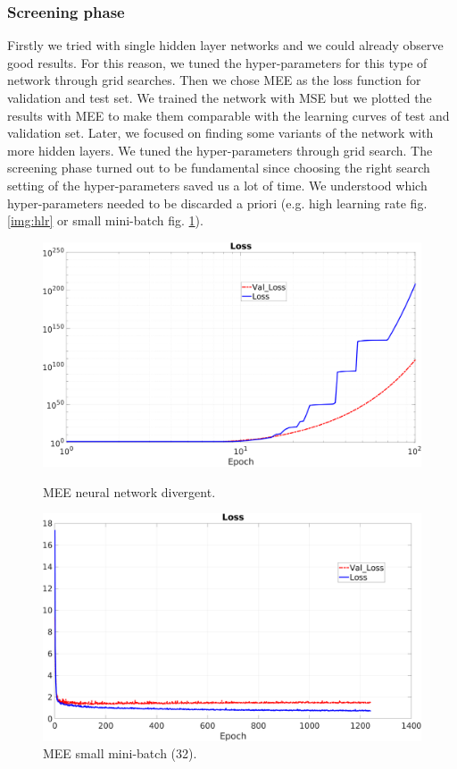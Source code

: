 \subsubsection{Screening phase}
Firstly we tried with single hidden layer networks and we could already observe good results. For this reason, we tuned the hyper-parameters for this type of network through grid searches.
Then we chose MEE as the loss function for validation and test set. We trained the network with MSE but we plotted the results with MEE to make them comparable with the learning curves of test and validation set.
Later, we focused on finding some variants of the network with more hidden layers. We tuned the hyper-parameters through grid search.
The screening phase turned out to be fundamental since choosing the right search setting of the hyper-parameters saved us a lot of time. We understood  which hyper-parameters needed to be discarded a priori (e.g. high learning rate fig. \ref{img:hlr} or small mini-batch fig. \ref{img:smb}).

\begin{figure}[H]
	\centering
	\begin{minipage}[t]{0.5\linewidth}
		\includegraphics[width=\linewidth]{img/Cup_loss_divergente.png}
		\caption{MEE neural network divergent.}
		\label{img:hlr}
	\end{minipage}%
	\begin{minipage}[t]{0.5\linewidth}
		\includegraphics[width=\linewidth]{img/Cup_loss_noSmooth.png}
		\caption{MEE small mini-batch (32).}
		\label{img:smb}
	\end{minipage}
\end{figure}

